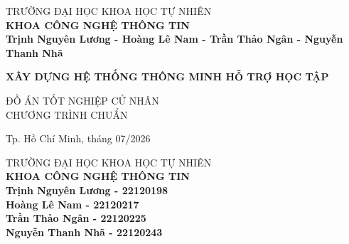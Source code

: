\begin{titlepage}

\begin{center}
TRƯỜNG ĐẠI HỌC KHOA HỌC TỰ NHIÊN\\
\textbf{KHOA CÔNG NGHỆ THÔNG TIN}\\[2cm]


{ \Large \bfseries Trịnh Nguyên Lương - Hoàng Lê Nam - Trần Thảo Ngân - Nguyễn Thanh Nhã\\[2cm] } 


{ \Large \bfseries XÂY DỰNG HỆ THỐNG THÔNG MINH HỖ TRỢ HỌC TẬP\\[3cm]} 


\large ĐỒ ÁN TỐT NGHIỆP CỬ NHÂN\\
\large CHƯƠNG TRÌNH CHUẨN\\



\vfill
Tp. Hồ Chí Minh, tháng 07/2026

\end{center}

\pagebreak



\begin{center}

TRƯỜNG ĐẠI HỌC KHOA HỌC TỰ NHIÊN\\
\textbf{KHOA CÔNG NGHỆ THÔNG TIN}\\[1cm]


{\large \bfseries Trịnh Nguyên Lương - 22120198\\} 
{\large \bfseries Hoàng Lê Nam - 22120217\\} 
{\large \bfseries Trần Thảo Ngân - 22120225\\} 
{\large \bfseries Nguyễn Thanh Nhã - 22120243\\[1cm]} 


\end{center}
\end{titlepage}
